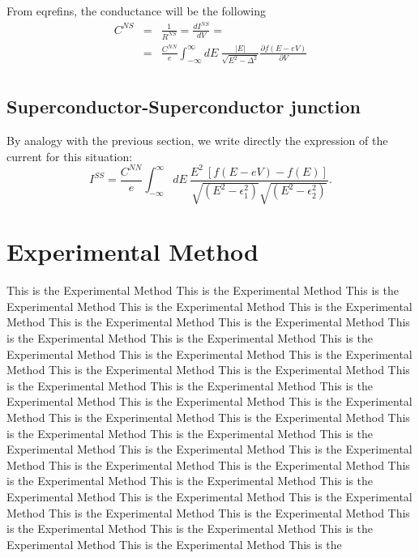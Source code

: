 \documentclass[twocolumn, twoside,a4paper,10pt]{article}
\begin{document}
From eqref{ins}, the conductance will be the following
\begin{eqnarray}\label{cns}
C^{NS} &=& \frac{1}{R^{NS}} = \frac{dI^{NS}}{dV} =
		\nonumber \\
		&=& \frac{C^{NN}}{e} \int_{-\infty}^{\infty} dE\ \frac{|E|}{\sqrt{E^2-\Delta^2}} 
		\frac{\partial f(E-eV)}{\partial V}
		\nonumber \\
\end{eqnarray}

\subsection{Superconductor-Superconductor junction} 
By analogy with the previous section, we write directly the expression of the current for this situation:
\begin{equation}\label{ins}
I^{SS} = \frac{C^{NN}}{e} \int_{-\infty}^{\infty} dE\ 
		\frac{E^2\ [f(E-eV)-f(E)]}{\sqrt{(E^2-\epsilon_1^2)}\sqrt{(E^2-\epsilon_2^2)}}.
\end{equation}

\section{Experimental Method}
This is the Experimental Method This is the Experimental Method This is the Experimental Method This is the Experimental Method This is the Experimental Method This is the Experimental Method This is the Experimental Method This is the Experimental Method This is the Experimental Method This is the Experimental Method This is the Experimental Method This is the Experimental Method This is the Experimental Method This is the Experimental Method This is the Experimental Method This is the Experimental Method This is the Experimental Method This is the Experimental Method This is the Experimental Method This is the Experimental Method This is the Experimental Method This is the Experimental Method This is the Experimental Method This is the Experimental Method This is the Experimental Method This is the Experimental Method This is the Experimental Method This is the Experimental Method This is the Experimental Method This is the Experimental Method This is the Experimental Method This is the Experimental Method This is the Experimental Method This is the Experimental Method This is the Experimental Method This is the Experimental Method This is the Experimental Method This is the Experimental Method This is the Experimental Method This is the 
\end{document}
